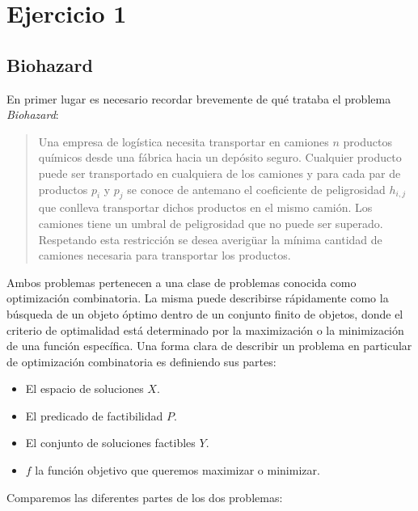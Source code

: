 \section{Ejercicio 1}

\subsection{Biohazard}
En primer lugar es necesario recordar brevemente de qué trataba el problema \emph{Biohazard}:
\begin{quotation}
  Una empresa de logística necesita transportar en camiones $n$ productos químicos desde una fábrica
  hacia un depósito seguro. Cualquier producto puede ser transportado en cualquiera de los camiones
  y para cada par de productos $p_i$ y $p_j$ se conoce de antemano el coeficiente de peligrosidad $h_{i,j}$
  que conlleva transportar dichos productos en el mismo camión. Los camiones tiene un umbral de peligrosidad
  que no puede ser superado. Respetando esta restricción se desea averigüar la mínima cantidad de camiones
  necesaria para transportar los productos.
\end{quotation}
Ambos problemas pertenecen a una clase de problemas conocida como optimización combinatoria. La misma
puede describirse rápidamente como la búsqueda de un objeto óptimo dentro de un conjunto finito de objetos,
donde el criterio de optimalidad está determinado por la maximización o la minimización de una función
específica. Una forma clara de describir un problema en particular de optimización combinatoria es
definiendo sus partes:
\begin{itemize}
  \item El espacio de soluciones $X$.
  \item El predicado de factibilidad $P$.
  \item El conjunto de soluciones factibles $Y$.
  \item $f$ la función objetivo que queremos maximizar o minimizar.
\end{itemize}

Comparemos las diferentes partes de los dos problemas:

